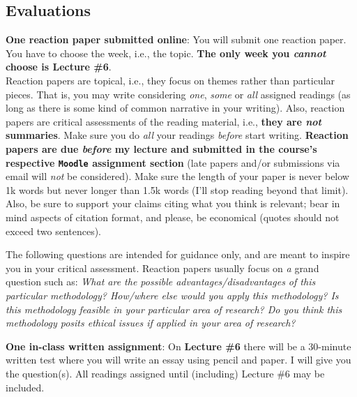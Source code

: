 \documentclass[letterpaper]{article}\usepackage[]{graphicx}\usepackage[svgnames]{xcolor}
\renewenvironment{itemize}{
  \begin{list}{}{
    \setlength{\leftmargin}{1.5em}
  }
}{
  \end{list}
}
\begin{document}
\subsection*{Evaluations}

\begin{enumerate}
  \item {\bf One reaction paper submitted online}: You will submit one reaction paper. You have to choose the week, i.e., the topic. {\bf The only week you \emph{cannot} choose is Lecture \#6}.\\

  Reaction papers are topical, i.e., they focus on themes rather than particular pieces. That is, you may write considering \emph{one}, \emph{some} or \emph{all} assigned readings (as long as there is some kind of common narrative in your writing). Also, reaction papers are critical assessments of the reading material, i.e., {\bf they are \emph{not} summaries}. Make sure you do \emph{all} your readings \emph{before} start writing. {\bf Reaction papers are due \emph{before} my lecture and submitted in the course's respective \texttt{Moodle} assignment section} (late papers and/or submissions via email will \emph{not} be considered). Make sure the length of your paper is never below 1k words but never longer than 1.5k words (I'll stop reading beyond that limit). Also, be sure to support your claims citing what you think is relevant; bear in mind aspects of citation format, and please, be economical (quotes should not exceed two sentences).


  \begin{itemize}
    \item[\Pointinghand] The following questions are intended for guidance only, and are meant to inspire you in your critical assessment. Reaction papers usually focus on \emph{a} grand question such as: \emph{What are the possible advantages/disadvantages of this particular methodology? How/where else would you apply this methodology? Is this methodology feasible in your particular area of research? Do you think this methodology posits ethical issues if applied in your area of research?}
  \end{itemize}
  
  \item {\bf One in-class written assignment}: On {\bf Lecture \#6} there will be a 30-minute written test where you will write an essay using pencil and paper. I will give you the question(s). All readings assigned until (including) Lecture \#6 may be included.


\end{enumerate}
\end{document}
